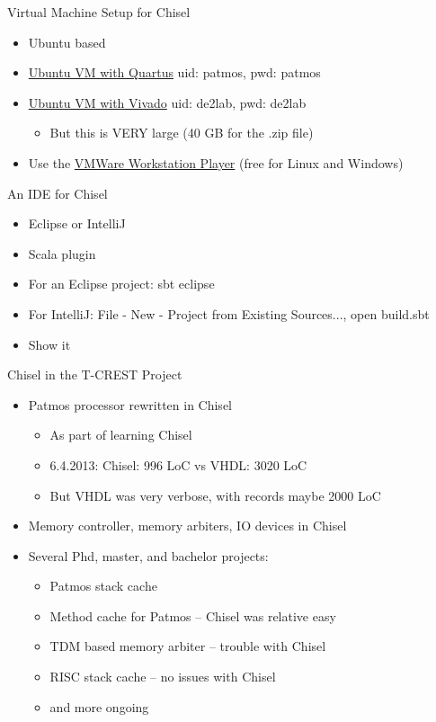 \documentclass[xcolor=pdflatex,dvipsnames,table]{beamer}
\begin{document}
\begin{frame}[fragile]{Virtual Machine Setup for Chisel}
\begin{itemize}
\item Ubuntu based
\item \href{http://patmos.compute.dtu.dk/patmos-dev.zip}{Ubuntu VM with Quartus} uid: patmos, pwd: patmos
\item \href{https://patmos-download.compute.dtu.dk/de2lab.zip}{Ubuntu VM with Vivado} uid: de2lab, pwd: de2lab
\begin{itemize}
\item But this is VERY large (40 GB for the .zip file)
\end{itemize}
\item Use the  \href{https://www.vmware.com/products/workstation-player.html} {VMWare Workstation Player} (free for Linux and Windows)
\end{itemize}
\end{frame}

\begin{frame}[fragile]{An IDE for Chisel}
\begin{itemize}
\item Eclipse or IntelliJ
\item Scala plugin
\item For an Eclipse project: sbt eclipse
\item For IntelliJ: File - New - Project from Existing Sources..., open build.sbt
\item Show it
\end{itemize}
\end{frame}

\begin{frame}[fragile]{Chisel in the T-CREST Project}
\begin{itemize}
\item Patmos processor rewritten in Chisel
\begin{itemize}
\item As part of learning Chisel
\item 6.4.2013: Chisel: 996 LoC vs VHDL: 3020 LoC
\item But VHDL was very verbose, with records maybe 2000 LoC
\end{itemize}
\item Memory controller, memory arbiters, IO devices in Chisel
\item Several Phd, master, and bachelor projects:
\begin{itemize}
\item Patmos stack cache
\item Method cache for Patmos -- Chisel was relative easy
\item TDM based memory arbiter -- trouble with Chisel
\item RISC stack cache -- no issues with Chisel
\item and more ongoing 
\end{itemize}
\end{itemize}
\end{frame}
\end{document}
